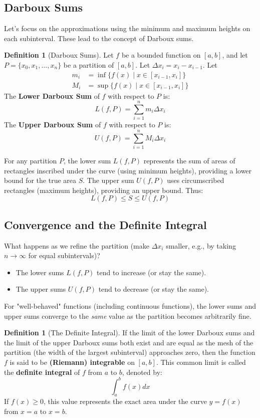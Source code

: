 \documentclass[11pt]{article}
\theoremstyle{plain}
\theoremstyle{definition}
\newtheorem{definition}[theorem]{Definition}
\theoremstyle{remark}
\begin{document}
\subsection{Darboux Sums}

Let's focus on the approximations using the minimum and maximum heights on each subinterval. These lead to the concept of Darboux sums.

\begin{definition}[Darboux Sums]
Let $f$ be a bounded function on $[a,b]$, and let $P = \{x_0, x_1, \dots, x_n\}$ be a partition of $[a,b]$. Let $\Delta x_i = x_i - x_{i-1}$. Let
\begin{align*} m_i &= \inf \{ f(x) \mid x \in [x_{i-1}, x_i] \} \\ M_i &= \sup \{ f(x) \mid x \in [x_{i-1}, x_i] \} \end{align*}
The \textbf{Lower Darboux Sum} of $f$ with respect to $P$ is:
\[ L(f, P) = \sum_{i=1}^n m_i \Delta x_i \]
The \textbf{Upper Darboux Sum} of $f$ with respect to $P$ is:
\[ U(f, P) = \sum_{i=1}^n M_i \Delta x_i \]
\end{definition}

For any partition $P$, the lower sum $L(f,P)$ represents the sum of areas of rectangles inscribed under the curve (using minimum heights), providing a lower bound for the true area $S$. The upper sum $U(f,P)$ uses circumscribed rectangles (maximum heights), providing an upper bound. Thus:
\[ L(f, P) \le S \le U(f, P) \]

\subsection{Convergence and the Definite Integral}

What happens as we refine the partition (make $\Delta x_i$ smaller, e.g., by taking $n \to \infty$ for equal subintervals)?
\begin{itemize}
    \item The lower sums $L(f,P)$ tend to increase (or stay the same).
    \item The upper sums $U(f,P)$ tend to decrease (or stay the same).
\end{itemize}
For "well-behaved" functions (including continuous functions), the lower sums and upper sums converge to the \emph{same} value as the partition becomes arbitrarily fine.

\begin{definition}[The Definite Integral]
If the limit of the lower Darboux sums and the limit of the upper Darboux sums both exist and are equal as the mesh of the partition (the width of the largest subinterval) approaches zero, then the function $f$ is said to be \textbf{(Riemann) integrable} on $[a,b]$. This common limit is called the \textbf{definite integral} of $f$ from $a$ to $b$, denoted by:
\[ \int_a^b f(x) dx \]
If $f(x) \ge 0$, this value represents the exact area under the curve $y=f(x)$ from $x=a$ to $x=b$.
\end{definition}
\end{document}
